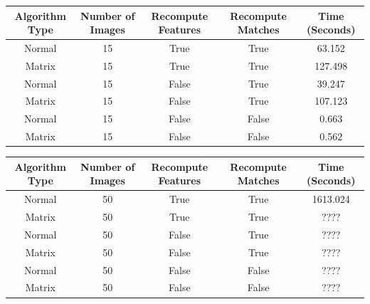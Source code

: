\documentclass[12pt]{article}
\begin{document}
	
	\begin{table}[H]
	\begin{adjustbox}{width=\columnwidth,center}
		\begin{tabular}{|c|c|c|c|c|}
			\hline
			\textbf{Algorithm Type} & 	\textbf{Number of Images} & 	\textbf{Recompute Features} & 	\textbf{Recompute Matches} & 	\textbf{Time (Seconds)} \\ \hline
			Normal & 15 & True & True & 63.152 \\ \hline
			Matrix & 15 & True & True & 127.498 \\ \hline
			Normal & 15 & False & True & 39.247 \\ \hline
			Matrix & 15 & False & True & 107.123 \\ \hline
			Normal & 15 & False & False & 0.663 \\ \hline
			Matrix & 15 & False & False & 0.562 \\ \hline
		\end{tabular}
	\end{adjustbox}
	\end{table}

\begin{table}[H]
	\begin{adjustbox}{width=\columnwidth,center}
		\begin{tabular}{|c|c|c|c|c|}
			\hline
			\textbf{Algorithm Type} & 	\textbf{Number of Images} & 	\textbf{Recompute Features} & 	\textbf{Recompute Matches} & 	\textbf{Time (Seconds)} \\ \hline
			Normal & 50 & True & True & 1613.024 \\ \hline
			Matrix & 50 & True & True &  ???? \\ \hline
			Normal & 50 & False & True & ???? \\ \hline
			Matrix & 50 & False & True &  ???? \\ \hline
			Normal & 50 & False & False & ???? \\ \hline
			Matrix & 50 & False & False &  ???? \\ \hline
		\end{tabular}
	\end{adjustbox}
\end{table}
\end{document}

